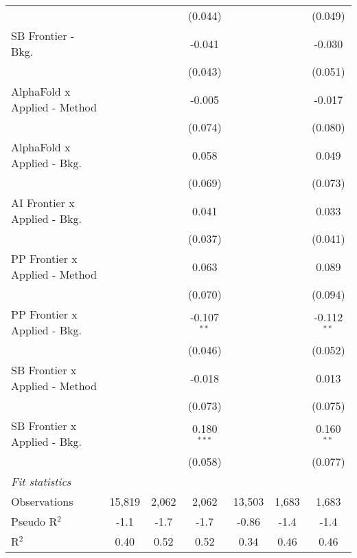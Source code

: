 \begin{tabular}{lcccccc}
                                  &         &                & (0.044)       &              &              & (0.049)\\   
   SB Frontier - Bkg.             &         &                & -0.041        &              &              & -0.030\\   
                                  &         &                & (0.043)       &              &              & (0.051)\\   
   AlphaFold x Applied - Method   &         &                & -0.005        &              &              & -0.017\\   
                                  &         &                & (0.074)       &              &              & (0.080)\\   
   AlphaFold x Applied - Bkg.     &         &                & 0.058         &              &              & 0.049\\   
                                  &         &                & (0.069)       &              &              & (0.073)\\   
   AI Frontier x Applied - Bkg.   &         &                & 0.041         &              &              & 0.033\\   
                                  &         &                & (0.037)       &              &              & (0.041)\\   
   PP Frontier x Applied - Method &         &                & 0.063         &              &              & 0.089\\   
                                  &         &                & (0.070)       &              &              & (0.094)\\   
   PP Frontier x Applied - Bkg.   &         &                & -0.107$^{**}$ &              &              & -0.112$^{**}$\\   
                                  &         &                & (0.046)       &              &              & (0.052)\\   
   SB Frontier x Applied - Method &         &                & -0.018        &              &              & 0.013\\   
                                  &         &                & (0.073)       &              &              & (0.075)\\   
   SB Frontier x Applied - Bkg.   &         &                & 0.180$^{***}$ &              &              & 0.160$^{**}$\\   
                                  &         &                & (0.058)       &              &              & (0.077)\\   
   \midrule
   \emph{Fit statistics}\\
   Observations                   & 15,819  & 2,062          & 2,062         & 13,503       & 1,683        & 1,683\\  
   Pseudo R$^2$                   & -1.1    & -1.7           & -1.7          & -0.86        & -1.4         & -1.4\\  
   R$^2$                          & 0.40    & 0.52           & 0.52          & 0.34         & 0.46         & 0.46\\  
   

\end{tabular}
